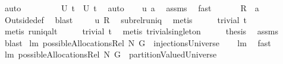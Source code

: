 \begin{isabellebody}
\ auto\isanewline
\ \ \isamarkupfalse%
\ \isamarkupfalse%
\ \isanewline
\ \ {}{\isacharcolon}\ {\isachardoublequoteopen}{\isacharquery}U\ {\isacharquery}t{}\ {\isasymsubseteq}\ {\isacharquery}U\ {\isacharquery}t{}{\isachardoublequoteclose}\ \isamarkupfalse%
\ auto\isanewline
\ \ \isamarkupfalse%
\ {\isachardoublequoteopen}{\isacharquery}u\ a{\isachardoublequoteclose}\ \isamarkupfalse%
\ assms\ \isamarkupfalse%
\ fast\ \isanewline
\ \ \isamarkupfalse%
\ \isamarkupfalse%
\ {\isachardoublequoteopen}{\isacharquery}R\ {\isasymsubseteq}\ a{\isachardoublequoteclose}\ \isamarkupfalse%
\ Outside{\isacharunderscore}def\ \isamarkupfalse%
\ blast\ \isamarkupfalse%
\isanewline
\ \ \isamarkupfalse%
\ {\isachardoublequoteopen}{\isacharquery}u\ {\isacharquery}R{\isachardoublequoteclose}\ \isamarkupfalse%
\ subrel{\isacharunderscore}runiq\ \isamarkupfalse%
\ metis\isanewline
\ \ \isamarkupfalse%
\ \isamarkupfalse%
\ {\isachardoublequoteopen}trivial\ {\isacharquery}t{}{\isachardoublequoteclose}\ \isamarkupfalse%
\ {\isacharparenleft}metis\ runiq{\isacharunderscore}alt{\isacharparenright}\isanewline
\ \ \isamarkupfalse%
\ \isamarkupfalse%
\ {\isachardoublequoteopen}trivial\ {\isacharquery}t{}{\isachardoublequoteclose}\ \isamarkupfalse%
\ {\isacharparenleft}metis\ trivial{\isacharunderscore}singleton{\isacharparenright}\isanewline
\ \ \isamarkupfalse%
\ \isamarkupfalse%
\ {\isacharquery}thesis\ \isamarkupfalse%
\ assms\ {}\ \isamarkupfalse%
\ blast\isanewline
{}\isamarkupfalse%
%
\endisatagproof
{\isafoldproof}%
%
\isadelimproof
\isanewline
%
\endisadelimproof
\isanewline
{}\isamarkupfalse%
\ lm{}{}{\isacharcolon}\ {\isachardoublequoteopen}possibleAllocationsRel\ N\ G\ {\isasymsubseteq}\ injectionsUniverse{\isachardoublequoteclose}%
\isadelimproof
\ %
\endisadelimproof
%
\isatagproof
{}\isamarkupfalse%
\ \ lm{}{}\ \isamarkupfalse%
\ fast%
\endisatagproof
{\isafoldproof}%
%
\isadelimproof
%
\endisadelimproof
\isanewline
\isanewline
{}\isamarkupfalse%
\ lm{}{}{\isacharcolon}\ {\isachardoublequoteopen}possibleAllocationsRel\ N\ G\ {\isasymsubseteq}\ partitionValuedUniverse{\isachardoublequoteclose}\isanewline

\end{isabellebody}
